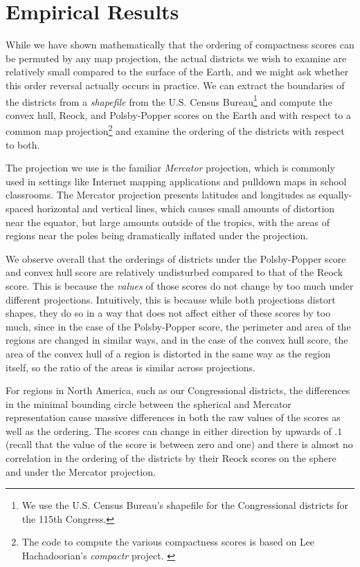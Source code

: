 
\section{Empirical Results}\label{sec:exper}




While we have shown mathematically that the ordering of compactness scores can be permuted by any map 
projection, the actual districts we wish to examine are relatively small compared to the surface of the Earth, 
and we might ask whether this order reversal actually occurs in practice.
We can extract the boundaries of the districts from a \textit{shapefile} from the U.S. Census Bureau\footnote{We use the U.S. Census Bureau's shapefile for the Congressional districts for the 115th Congress.} and compute the convex hull, Reock, and Polsby-Popper scores on the Earth and with respect to a common map projection\footnote{The code to compute the various compactness scores is based on Lee Hachadoorian's \textit{compactr} project. \cite{hachadoorian2018reock}} and examine the ordering of the districts with respect to both.

The projection we use is the familiar \textit{Mercator} projection, which is commonly used in settings like Internet mapping applications and pulldown maps in school classrooms.  
The Mercator projection presents latitudes and longitudes as equally-spaced horizontal and vertical lines, which causes small amounts of distortion near the equator, but large amounts outside of the tropics, with the areas of regions near the poles being dramatically inflated under the projection.








We observe overall that the orderings of districts under the Polsby-Popper score and convex hull score are relatively undisturbed compared to that of the Reock score.  This is because the \textit{values} of those scores do not change by too much under different projections.  Intuitively, this is because while both projections distort shapes, they do so in a way that does not affect either of these scores by too much, since in the case of the Polsby-Popper score, the perimeter and area of the regions are changed in similar ways, and in the case of the convex hull score, the area of the convex hull of a region is distorted in the same way as the region itself, so the ratio of the areas is similar across projections.

For regions in North America, such as our Congressional districts, the differences in the minimal bounding circle between the spherical and Mercator representation cause massive differences in both the raw values of the scores as well as the ordering.  The scores can change in either direction by upwards of $.1$ (recall that the value of the score is between zero and one) and there is almost no correlation in the ordering of the districts by their Reock scores on the sphere and under the Mercator projection. 

